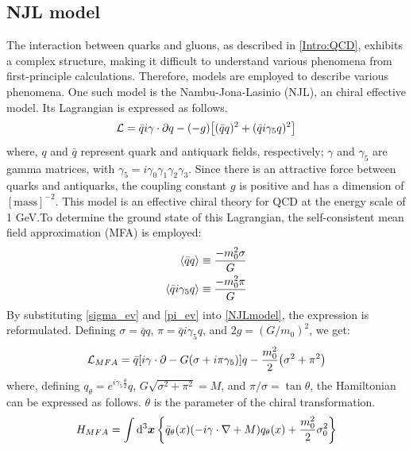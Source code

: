     \subsection{NJL model}
    \label{NJL model}      
        The interaction between quarks and gluons, as described in \ref{Intro:QCD}, exhibits a complex structure, making it difficult to understand various phenomena from first-principle calculations. Therefore, models are employed to describe various phenomena. One such model is the Nambu-Jona-Lasinio (NJL), an chiral effective model. Its Lagrangian is expressed as follows.
        \begin{eqnarray}
            \label{NJLmodel}
            \mathcal{L}=\bar{q}i\gamma \cdot \partial q -(-g)\qty[(\bar{q}q)^2+(\bar{q}i\gamma_5q)^2]
        \end{eqnarray}  
        where, $q$ and $\bar{q}$ represent quark and antiquark fields, respectively; $\gamma$ and $\gamma_5$ are gamma matrices, with $\gamma_5 = i \gamma_0 \gamma_1 \gamma_2 \gamma_3$. Since there is an attractive force between quarks and antiquarks, the coupling constant $g$ is positive and has a dimension of $[\text{mass}]^{-2}$.  
        This model is an effective chiral theory for QCD at the energy scale of 1 GeV.\@ To determine the ground state of this Lagrangian, the self-consistent mean field approximation (MFA) is employed: 
        \begin{eqnarray}
            \label{sigma_ev}
            \ev{\bar{q}q}\equiv \frac{-m_0^2 \sigma}{G}\\
            \label{pi_ev}
            \ev{\bar{q}i\gamma_5q}\equiv \frac{-m_0^2 \pi}{G}
        \end{eqnarray}
        By substituting \eqref{sigma_ev} and \eqref{pi_ev} into \eqref{NJLmodel}, the expression is reformulated. Defining $\sigma = \bar{q}q$, $\pi = \bar{q} i \gamma_5 q$, and $2g = (G/m_0)^2$, we get:  
        \begin{eqnarray}
            \label{heikinbago}
            \mathcal{L}_{MFA} = \bar{q}\qty[i \gamma \cdot \partial - G(\sigma + i \pi \gamma_5)]q-\frac{m_0^2}{2}\qty(\sigma^2+\pi^2)
        \end{eqnarray}
        where, defining $q_\theta = e^{i \gamma_5 \frac{\theta}{2}} q$, $G \sqrt{\sigma^2 + \pi^2} = M$, and $\pi / \sigma = \tan{\theta}$, the Hamiltonian can be expressed as follows. $\theta$ is the parameter of the chiral transformation.  
        \begin{eqnarray}
            \label{ham}
            H_{MFA}=\int \dd[3]{\bm{x}}\qty{\bar{q}_\theta (x)(-i\gamma \cdot \nabla+M)q_{\theta}(x)+\frac{m_0^2}{2}\sigma_0^2}
        \end{eqnarray}
